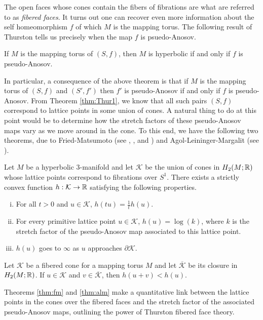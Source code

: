 The open faces whose cones contain the fibers of fibrations are what are referred to as
\emph{fibered faces}.  It turns out one can recover even more information about the self
homeomorphism $f$ of which $M$ is the mapping torus. The following result of Thurston tells us
precisely when the map $f$ is psuedo-Anosov.

\begin{thm}
    \label{thm:ThurHyp}
  If $M$ is the mapping torus of $(S, f)$, then $M$ is hyperbolic if and only if $f$ is pseudo-Anosov.
\end{thm}

In particular, a consequence of the above theorem is that if $M$ is the mapping torus of $(S, f)$
and $(S', f')$ then $f'$ is pseudo-Anosov if and only if $f$ is pseudo-Anosov. From Theorem
\ref{thm:Thur1}, we know that all such pairs $(S, f)$ correspond to lattice points in some union of
cones. A natural thing to do at this point would be to determine how the stretch factors of these
pseudo-Anosov maps vary as we move around in the cone. To this end, we have the following two
theorems, due to Fried-Matsumoto (see \cite{fried1982flow}, \cite{fried1983transitive}, and
\cite{matsumoto1987topological}) and Agol-Leininger-Margalit (see \cite{agol6983pseudo}).

\begin{thm}
  \label{thm:fm}
  Let $M$ be a hyperbolic $3$-manifold and let $\mathcal{K}$ be the union of cones in
  $H_2(M; \mathbb{R})$ whose lattice points correspond to fibrations over $S^1$.  There exists a strictly
  convex function $h: \mathcal{K} \to \mathbb{R}$ satisfying the following properties.
  \begin{enumerate}[(i)]
  \item For all $t > 0$ and $u \in \mathcal{K}$, $h(tu) =  \frac{1}{t}h(u)$.
  \item For every primitive lattice point $u \in \mathcal{K}$, $h(u) = \log(k)$, where $k$ is the
    stretch factor of the pseudo-Anosov map associated to this lattice point.
  \item $h(u)$ goes to $\infty$ as $u$ approaches $\partial \mathcal{K}$.
  \end{enumerate}
\end{thm}

\begin{thm}
  \label{thm:alm}
  Let $\mathcal{K}$ be a fibered cone for a mapping torus $M$ and let $\overline{\mathcal{K}}$ be its closure
  in $H_2(M;\mathbb{R})$. If $u \in \mathcal{K}$ and $v \in \overline{\mathcal{K}}$, then $h(u+v) < h(u)$.
\end{thm}
Theorems \ref{thm:fm} and \ref{thm:alm} make a quantitative link between the lattice points in the cones
over the fibered faces and the stretch factor of the associated pseudo-Anosov maps, outlining the power
of Thurston fibered face theory.

